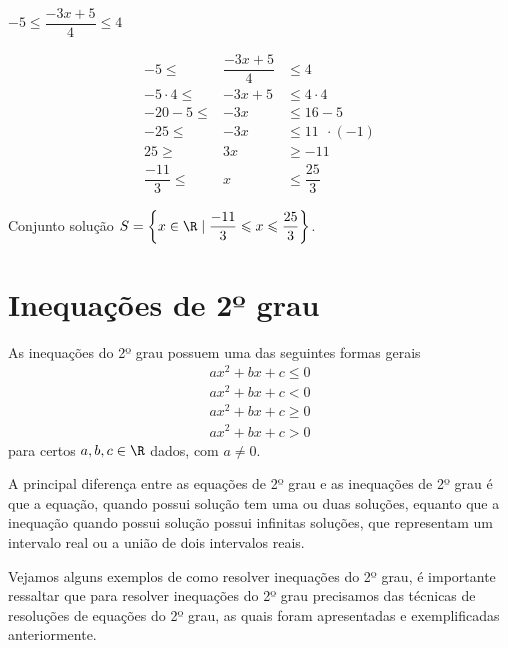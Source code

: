 \begin{exem}
$-5 \leqslant \dfrac{-3x + 5}{4} \leqslant 4$
  
  \begin{eqnarray*}
  -5 \leqslant & \dfrac{-3x + 5}{4} & \leqslant  4 \\
   -5 \cdot 4  \leqslant & -3x + 5 & \leqslant 4 \cdot 4 \\
   -20 - 5  \leqslant & -3x & \leqslant 16 - 5 \\
   -25  \leqslant & -3x & \leqslant 11  \ \ \cdot(-1) \\
   25  \geqslant & 3x & \geqslant -11 \\
   \dfrac{-11}{3}  \leqslant & x & \leqslant \dfrac{25}{3}
 \end{eqnarray*}
 
      
  Conjunto solução $S= \left\{x \in \R \mid \dfrac{-11}{3} \leqslant x \leqslant \dfrac{25}{3} \right\}$.
\end{exem}
 
 \section{Inequações de 2º grau}
 
 \vskip0.3cm
 \colorbox{azul}{
 \begin{minipage}{0.9\linewidth}
 \begin{center}
  As inequações do 2º grau possuem uma das seguintes formas gerais
 \begin{eqnarray*}
 ax^2 + bx + c \leq 0 \\
 ax^2 + bx + c < 0 \\
 ax^2 + bx + c \geq 0 \\
 ax^2 + bx + c >0 
 \end{eqnarray*}  
 para certos $a, b, c \in \R$ dados, com $a \neq 0$.
 \end{center}
 \end{minipage}}
 \vskip0.3cm
  
 A principal diferença entre as equações de 2º grau e as inequações de 2º grau é que a equação, quando possui solução tem uma ou duas soluções, equanto que a inequação quando possui solução possui infinitas soluções, que representam um intervalo real ou a união de dois intervalos reais. 
 
 Vejamos alguns exemplos de como resolver inequações do 2º grau, é importante ressaltar que para resolver inequações do 2º grau precisamos das técnicas de resoluções de equações do 2º grau, as quais foram apresentadas e exemplificadas anteriormente.
 
